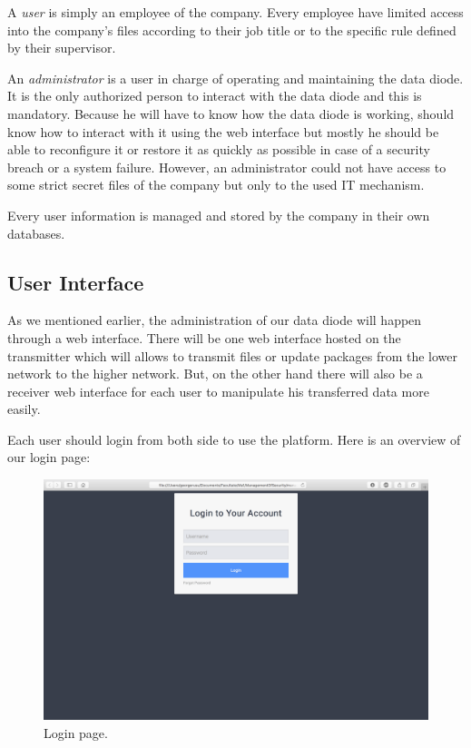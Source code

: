 \documentclass[a4paper,10pt]{article}
\begin{document}
A \textit{user} is simply an employee of the company. Every employee have limited access into the company's files according to their job title or to the specific rule defined by their supervisor.

An \textit{administrator} is a user in charge of operating and maintaining the data diode. It is the only authorized person to interact with the data diode and this is mandatory. Because he will have to know how the data diode is working, should know how to interact with it using the web interface but mostly he should be able to reconfigure it or restore it as quickly as possible in case of a security breach or a system failure. However, an administrator could not have access to some strict secret files of the company but only to the used IT mechanism.

Every user information is managed and stored by the company in their own databases.

\subsection{User Interface}

As we mentioned earlier, the administration of our data diode will happen through a web interface. There will be one web interface hosted on the transmitter which will allows to transmit files or update packages from the lower network to the higher network. But, on the other hand there will also be a receiver web interface for each user to manipulate his transferred data more easily.

Each user should login from both side to use the platform. Here is an overview of our login page:

\begin{figure}[!h]
\centering
\includegraphics[scale=0.35]{images/login.png}
\caption{Login page.}
\label{fig:logpage}
\end{figure}
\end{document}
